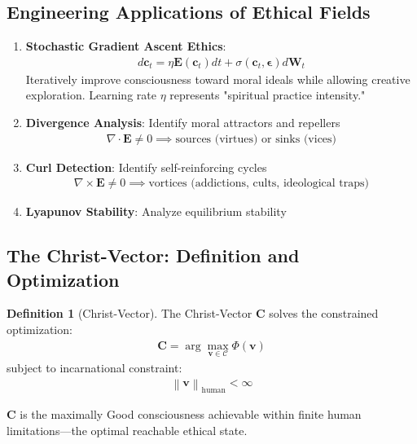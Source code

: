 \documentclass[11pt,a4paper]{article}
\theoremstyle{definition}
\newtheorem{definition}{Definition}[section]
\theoremstyle{remark}
\newcommand{\CC}{\mathcal{C}}
\newcommand{\EE}{\mathbf{E}}
\newcommand{\cc}{\mathbf{c}}
\newcommand{\norm}[1]{\left\|#1\right\|}
\begin{document}
\subsection{Engineering Applications of Ethical Fields}

\begin{enumerate}
\item \textbf{Stochastic Gradient Ascent Ethics}:
\begin{align}
d\cc_t = \eta \EE(\cc_t) dt + \sigma(\cc_t, \boldsymbol{\epsilon}) d\mathbf{W}_t
\end{align}
Iteratively improve consciousness toward moral ideals while allowing creative exploration. Learning rate \(\eta\) represents "spiritual practice intensity."

\item \textbf{Divergence Analysis}: Identify moral attractors and repellers
\begin{align}
\nabla \cdot \EE \neq 0 \implies \text{sources (virtues) or sinks (vices)}
\end{align}

\item \textbf{Curl Detection}: Identify self-reinforcing cycles
\begin{align}
\nabla \times \EE \neq 0 \implies \text{vortices (addictions, cults, ideological traps)}
\end{align}

\item \textbf{Lyapunov Stability}: Analyze equilibrium stability
\end{enumerate}

\subsection{The Christ-Vector: Definition and Optimization}

\begin{definition}[Christ-Vector]
The Christ-Vector \(\mathbf{C}\) solves the constrained optimization:
\begin{align}
\mathbf{C} = \arg\max_{\mathbf{v} \in \CC} \Phi(\mathbf{v})
\end{align}
subject to incarnational constraint:
\begin{align}
\norm{\mathbf{v}}_{\text{human}} < \infty
\end{align}

\(\mathbf{C}\) is the maximally Good consciousness achievable within finite human limitations—the optimal reachable ethical state.
\end{definition}
\end{document}
